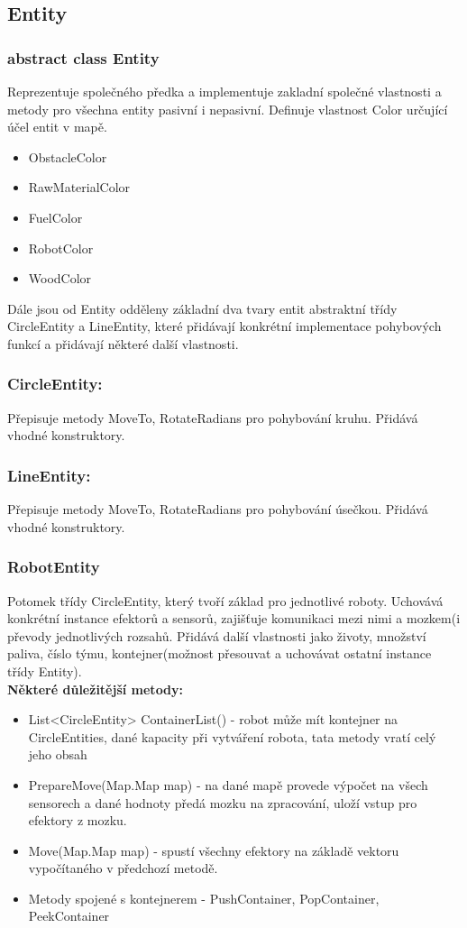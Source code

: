 \documentclass[12pt, oneside]{article}
\begin{document}
\subsection{Entity}
\subsubsection{abstract class Entity}
Reprezentuje společného předka a implementuje zakladní společné vlastnosti a metody pro všechna entity pasivní i nepasivní. Definuje vlastnost Color určující účel entit v mapě. 
\begin{itemize}
	\item ObstacleColor
	\item RawMaterialColor
	\item FuelColor
	\item RobotColor
	\item WoodColor 
\end{itemize}
Dále jsou od Entity odděleny základní dva tvary entit abstraktní třídy CircleEntity a LineEntity, které přidávají konkrétní implementace pohybových funkcí a 	přidávají některé další vlastnosti. 

\subsubsection{CircleEntity:}
Přepisuje metody MoveTo, RotateRadians pro  pohybování kruhu. Přidává vhodné konstruktory. \\ 
\subsubsection{LineEntity:}
Přepisuje metody MoveTo, RotateRadians pro pohybování úsečkou. Přidává vhodné konstruktory. \\ 
\newpage
\subsubsection{RobotEntity}
Potomek třídy CircleEntity, který tvoří základ pro jednotlivé roboty. Uchovává konkrétní instance efektorů a sensorů, zajišťuje komunikaci mezi nimi a mozkem(i převody jednotlivých rozsahů. Přidává další vlastnosti jako životy, množství paliva, číslo týmu, kontejner(možnost přesouvat a uchovávat ostatní instance třídy Entity). \\ 
\textbf{Některé důležitější metody:} 
\begin{itemize}
	\item List<CircleEntity> ContainerList() - robot může mít kontejner na CircleEntities, dané kapacity při vytváření robota, tata metody vratí celý jeho obsah
	\item PrepareMove(Map.Map map) - na dané mapě provede výpočet na všech sensorech a dané hodnoty předá mozku na zpracování, uloží vstup pro efektory z mozku. 
	\item Move(Map.Map map) - spustí všechny efektory na základě vektoru vypočítaného v předchozí metodě. 
	\item Metody spojené s kontejnerem - PushContainer, PopContainer, PeekContainer
\end{itemize}
\end{document}
